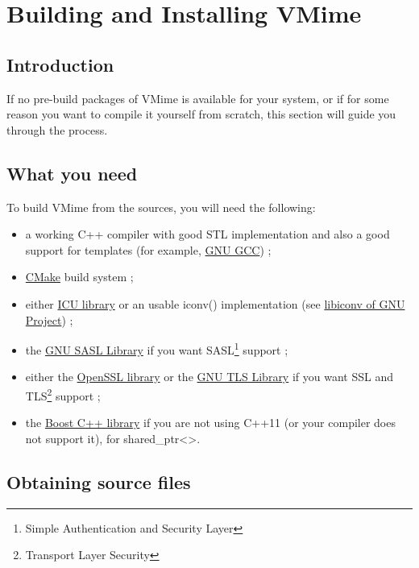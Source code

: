 \chapter{Building and Installing VMime\label{chapter_building}}

\section{Introduction}

If no pre-build packages of VMime is available for your system, or if for some
reason you want to compile it yourself from scratch, this section will guide
you through the process.

\section{What you need}

To build VMime from the sources, you will need the following:

\begin{itemize}
\item a working C++ compiler with good STL implementation and also a good
support for templates (for example, \href{http://gcc.gnu.org/}{GNU GCC}) ;
\item \href{http://www.cmake.org/}{CMake} build system ;
\item either \href{http://www.icu-project.org}{ICU library} or an usable
{\vcode iconv()} implementation (see
\href{http://www.gnu.org/software/libiconv/}{libiconv of GNU Project}) ;
\item the \href{http://www.gnu.org/software/gsasl/}{GNU SASL Library} if you
want SASL\footnote{Simple Authentication and Security Layer} support ;
\item either the \href{http://www.openssl.org}{OpenSSL library} or the
\href{http://www.gnu.org/software/gnutls/}{GNU TLS Library} if you
want SSL and TLS\footnote{Transport Layer Security} support ;
\item the \href{http://www.boost.org}{Boost C++ library} if you are not using
C++11 (or your compiler does not support it), for {\vcode shared\_ptr<>}.
\end{itemize}

\section{Obtaining source files}

